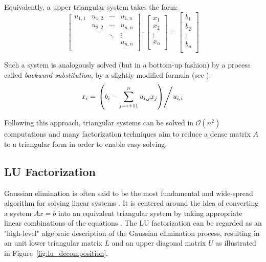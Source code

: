 \noindent Equivalently, a upper triangular system takes the form:
\begin{equation}
  \left[
    \begin{array}{cccc}
      u_{1,1} & u_{1,2} & \cdots & u_{1,n} \\
      & u_{2,2} & \cdots & u_{n,n} \\
      &  & \ddots & \vdots \\
      & & & u_{n,n}\\
    \end{array}
  \right] \cdot
  \left[
    \begin{array}{c}
      x_{1} \\
      x_{2} \\
      \vdots \\
      x_{n}  \\
    \end{array}
  \right] = 
  \left[
    \begin{array}{c}
      b_{1} \\
      b_{2} \\
      \vdots \\
      b_{n}  \\
    \end{array}
  \right] 
\end{equation}

\noindent Such a system is analogously solved (but in a bottom-up fashion) by a process called \textit{backward substitution}, by a slightly modified formula (see \cite{golub_matrix_2013}):
\begin{equation}
    x_i=\left. \left( b_i-\sum_{j=i+11}^{n}u_{i,j}x_j\right) \middle/ u_{i,i} \right.
\end{equation}

\noindent Following this approach, triangular systems can be solved in $\mathcal{O}(n^2)$ computations and many factorization techniques aim to reduce a dense matrix $A$ to a triangular form in order to enable easy solving.

\subsection{LU Factorization}
\label{sec:dlu_factorization}
Gaussian elimination is often said to be the most fundamental and wide-spread algorithm for solving linear systems \cite{greenbaum_iterative_1997}. It is centered around the idea of converting a system $Ax=b$ into an equivalent triangular system by taking appropriate linear combinations of the equations \cite{golub_matrix_2013}. The LU factorization can be regarded as an "high-level" algebraic description of the Gaussian elimination process, resulting in an unit lower triangular matrix $L$ and an upper diagonal matrix $U$ as illustrated in Figure~\hyperref[fig:lu_decomposition]{\ref{fig:lu_decomposition}}. 

